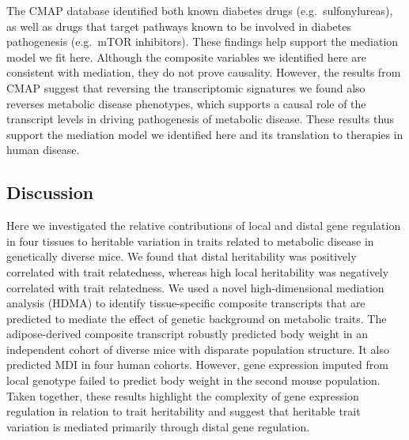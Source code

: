 \documentclass[
]{article}
\begin{document}
The CMAP database identified both known diabetes drugs
(e.g.~sulfonylureas), as well as drugs that target pathways known to be
involved in diabetes pathogenesis (e.g.~mTOR inhibitors). These findings
help support the mediation model we fit here. Although the composite
variables we identified here are consistent with mediation, they do not
prove causality. However, the results from CMAP suggest that reversing
the transcriptomic signatures we found also reverses metabolic disease
phenotypes, which supports a causal role of the transcript levels in
driving pathogenesis of metabolic disease. These results thus support
the mediation model we identified here and its translation to therapies
in human disease.

\subsection{Discussion}\label{discussion}

Here we investigated the relative contributions of local and distal gene
regulation in four tissues to heritable variation in traits related to
metabolic disease in genetically diverse mice. We found that distal
heritability was positively correlated with trait relatedness, whereas
high local heritability was negatively correlated with trait
relatedness. We used a novel high-dimensional mediation analysis (HDMA)
to identify tissue-specific composite transcripts that are predicted to
mediate the effect of genetic background on metabolic traits. The
adipose-derived composite transcript robustly predicted body weight in
an independent cohort of diverse mice with disparate population
structure. It also predicted MDI in four human cohorts. However, gene
expression imputed from local genotype failed to predict body weight in
the second mouse population. Taken together, these results highlight the
complexity of gene expression regulation in relation to trait
heritability and suggest that heritable trait variation is mediated
primarily through distal gene regulation.
\end{document}
